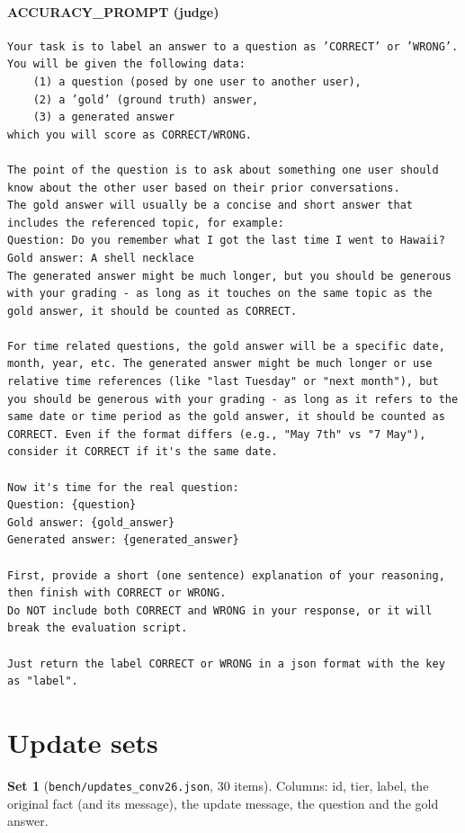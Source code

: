 \documentclass[11pt]{article}
\begin{document}
\paragraph{ACCURACY\_PROMPT (judge)}
\begin{lstlisting}
Your task is to label an answer to a question as ’CORRECT’ or ’WRONG’. You will be given the following data:
    (1) a question (posed by one user to another user),
    (2) a ’gold’ (ground truth) answer,
    (3) a generated answer
which you will score as CORRECT/WRONG.

The point of the question is to ask about something one user should know about the other user based on their prior conversations.
The gold answer will usually be a concise and short answer that includes the referenced topic, for example:
Question: Do you remember what I got the last time I went to Hawaii?
Gold answer: A shell necklace
The generated answer might be much longer, but you should be generous with your grading - as long as it touches on the same topic as the gold answer, it should be counted as CORRECT.

For time related questions, the gold answer will be a specific date, month, year, etc. The generated answer might be much longer or use relative time references (like "last Tuesday" or "next month"), but you should be generous with your grading - as long as it refers to the same date or time period as the gold answer, it should be counted as CORRECT. Even if the format differs (e.g., "May 7th" vs "7 May"), consider it CORRECT if it's the same date.

Now it's time for the real question:
Question: {question}
Gold answer: {gold_answer}
Generated answer: {generated_answer}

First, provide a short (one sentence) explanation of your reasoning, then finish with CORRECT or WRONG.
Do NOT include both CORRECT and WRONG in your response, or it will break the evaluation script.

Just return the label CORRECT or WRONG in a json format with the key as "label".
\end{lstlisting}
\section{Update sets}
\textbf{Set 1} (\texttt{bench/updates\_\allowbreak{}conv26.json}, 30 items). Columns: id, tier, label, the original fact (and its message), the update message, the question and the gold answer.
\end{document}
